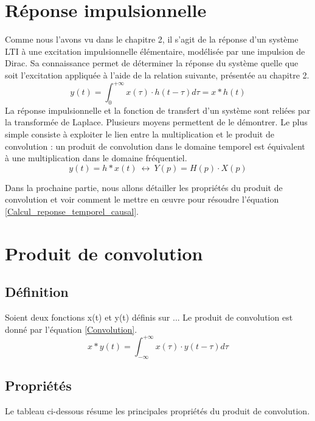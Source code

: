 \documentclass[]{book}
\begin{document}
{	\section{Réponse impulsionnelle}
	Comme nous l'avons vu dans le chapitre 2, il s'agit de la réponse d'un système LTI à une excitation impulsionnelle élémentaire, modélisée par une impulsion de Dirac. Sa connaissance permet de déterminer la réponse du système quelle que soit l'excitation appliquée à l'aide de la relation suivante, présentée au chapitre 2.
	\begin{equation}\label{Calcul_reponse_temporel_causal}
	y(t) = \int_{0}^{+ \infty} x(\tau) \cdot h(t-\tau)d\tau = x*h(t)
	\end{equation}
	\vspace{1\baselineskip}
	La réponse impulsionnelle et la fonction de transfert d'un système sont reliées par la transformée de Laplace. Plusieurs moyens permettent de le démontrer. Le plus simple consiste à exploiter le lien entre la multiplication et le produit de convolution : un produit de convolution dans le domaine temporel est équivalent à une multiplication dans le domaine fréquentiel.
	\begin{equation}\label{}
	y(t) =  h*x(t) ~\longleftrightarrow~Y(p)=H(p)\cdot X(p)
	\end{equation}
	
	Dans la prochaine partie, nous allons détailler les propriétés du produit de convolution et voir comment le mettre en œuvre pour résoudre l'équation \ref{Calcul_reponse_temporel_causal}.
	
	\section{Produit de convolution}
	\subsection{Définition}
	Soient deux fonctions x(t) et y(t) définis sur ... Le produit de convolution est donné par l'équation \ref{Convolution}.
	\begin{equation}\label{Convolution}
	x*y(t) = \int_{-\infty}^{+ \infty} x(\tau) \cdot y(t-\tau)d\tau 
	\end{equation}
	
	\subsection{Propriétés}
	Le tableau ci-dessous résume les principales propriétés du produit de convolution.
		
}
\end{document}
